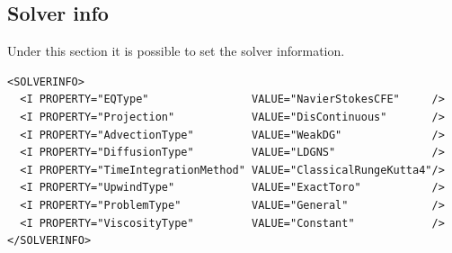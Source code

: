 \subsection*{Solver info}
Under this section it is possible to set the solver information.
\begin{lstlisting}[style=XmlStyle]       
<SOLVERINFO>
  <I PROPERTY="EQType"                VALUE="NavierStokesCFE"     />
  <I PROPERTY="Projection"            VALUE="DisContinuous"       />
  <I PROPERTY="AdvectionType"         VALUE="WeakDG"              />
  <I PROPERTY="DiffusionType"         VALUE="LDGNS"               />
  <I PROPERTY="TimeIntegrationMethod" VALUE="ClassicalRungeKutta4"/>
  <I PROPERTY="UpwindType"            VALUE="ExactToro"           />
  <I PROPERTY="ProblemType"           VALUE="General"             />
  <I PROPERTY="ViscosityType"         VALUE="Constant"            />
</SOLVERINFO>
\end{lstlisting}

